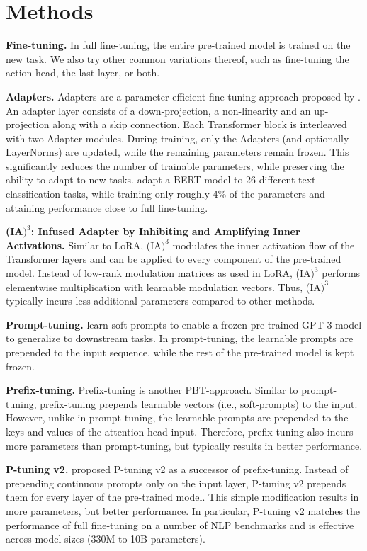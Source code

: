 \section{Methods}\label{appendix:methods}

\textbf{Fine-tuning.} In full fine-tuning, the entire pre-trained model is trained on the new task. We also try other common variations thereof, such as fine-tuning the action head, the last layer, or both.

\textbf{Adapters.} Adapters are a parameter-efficient fine-tuning approach proposed by \citet{Houlsby:19}. An adapter layer consists of a down-projection, a non-linearity and an up-projection along with a skip connection. Each Transformer block is interleaved with two Adapter modules. During training, only the Adapters (and optionally LayerNorms) are updated, while the remaining parameters remain frozen. This significantly reduces the number of trainable parameters, while preserving the ability to adapt to new tasks. \citet{Houlsby:19} adapt a BERT \citep{Devlin:18}  model to 26 different text classification tasks, while training only roughly 4\% of the parameters and attaining performance close to full fine-tuning. 


\textbf{(IA$\text{)}^3$: Infused Adapter by Inhibiting and Amplifying Inner Activations.} Similar to LoRA, (IA$\text{)}^3$ \citep{Liu:22} modulates the inner activation flow of the Transformer layers and can be applied to every component of the pre-trained model. Instead of low-rank modulation matrices as used in LoRA, (IA$\text{)}^3$ performs elementwise multiplication with learnable modulation vectors. Thus, (IA$\text{)}^3$ typically incurs less additional parameters compared to other methods. 

\textbf{Prompt-tuning.} \citet{Lester:21} learn soft prompts to enable a frozen pre-trained GPT-3 \citep{Brown:20} model to generalize to downstream tasks.
In prompt-tuning, the learnable prompts are prepended to the input sequence, while the rest of the pre-trained model is kept frozen.

\textbf{Prefix-tuning.} Prefix-tuning \citep{Xiang:21} is another PBT-approach. Similar to prompt-tuning, prefix-tuning prepends learnable vectors (i.e., soft-prompts) to the input. However, unlike in prompt-tuning, the learnable prompts are prepended to the keys and values of the attention head input. Therefore, prefix-tuning also incurs more parameters than prompt-tuning, but typically results in better performance. 

\textbf{P-tuning v2.} \citet{Liu:21a} proposed P-tuning v2 as a successor of prefix-tuning. Instead of prepending continuous prompts only on the input layer, P-tuning v2 prepends them for every layer of the pre-trained model. This simple modification results in more parameters, but better performance. In particular, P-tuning v2 matches the performance of full fine-tuning on a number of NLP benchmarks and is effective across model sizes (330M to 10B parameters). 

